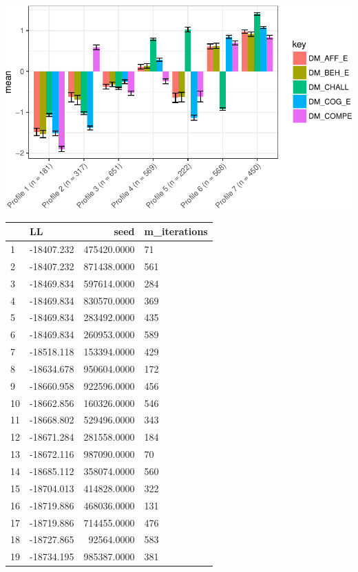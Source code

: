 \documentclass[]{book}
\theoremstyle{definition}
\theoremstyle{definition}
\theoremstyle{definition}
\theoremstyle{remark}
\begin{document}
\begin{center}\includegraphics[width=0.8\linewidth]{rosenberg-dissertation_files/figure-latex/spec-solutions-m1_7-1} \end{center}

\begin{tabular}{l|l|r|l}
\hline
  & LL & seed & m\_iterations\\
\hline
1 & -18407.232 & 475420.0000 & 71\\
\hline
2 & -18407.232 & 871438.0000 & 561\\
\hline
3 & -18469.834 & 597614.0000 & 284\\
\hline
4 & -18469.834 & 830570.0000 & 369\\
\hline
5 & -18469.834 & 283492.0000 & 435\\
\hline
6 & -18469.834 & 260953.0000 & 589\\
\hline
7 & -18518.118 & 153394.0000 & 429\\
\hline
8 & -18634.678 & 950604.0000 & 172\\
\hline
9 & -18660.958 & 922596.0000 & 456\\
\hline
10 & -18662.856 & 160326.0000 & 546\\
\hline
11 & -18668.802 & 529496.0000 & 343\\
\hline
12 & -18671.284 & 281558.0000 & 184\\
\hline
13 & -18672.116 & 987090.0000 & 70\\
\hline
14 & -18685.112 & 358074.0000 & 560\\
\hline
15 & -18704.013 & 414828.0000 & 322\\
\hline
16 & -18719.886 & 468036.0000 & 131\\
\hline
17 & -18719.886 & 714455.0000 & 476\\
\hline
18 & -18727.865 & 92564.0000 & 583\\
\hline
19 & -18734.195 & 985387.0000 & 381\\

\end{tabular}
\end{document}
